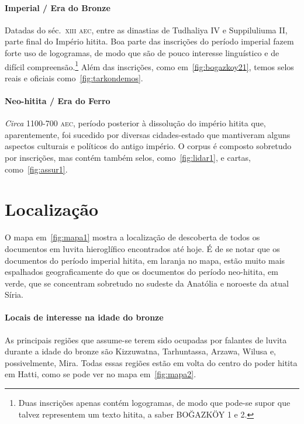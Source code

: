 \paragraph{Imperial \slash{} Era do Bronze} Datadas do séc.\ \textsc{xiii aec},
entre as dinastias de Tudhaliya IV e Suppiluliuma II, parte final do Império
hitita.
Boa parte das inscrições do período imperial fazem forte uso de logogramas,
de modo que são de pouco interesse linguístico e de difícil
compreensão.\footnote{Duas inscrições apenas contém logogramas, de modo que
	pode-se supor que talvez representem um texto hitita, a saber BOĞAZKÖY 1 e 2.}
Além das inscrições, como em~\autoref{fig:bogazkoy21},
temos selos reais e oficiais
como~\autoref{fig:tarkondemos}.


\paragraph{Neo-hitita \slash{} Era do Ferro} \emph{Circa} 1100-700 \textsc{aec},
período posterior à dissolução do império hitita que, aparentemente, foi
sucedido por diversas cidades-estado que mantiveram alguns aspectos
culturais e políticos do antigo império.
O corpus é composto sobretudo por inscrições, mas contém também selos,
como~\autoref{fig:lidar1}, e cartas, como~\autoref{fig:assur1}.



\section{Localização}

O mapa em~\autoref{fig:mapa1} mostra a localização de descoberta de todos os
documentos em luvita hieroglífico encontrados até hoje.
É de se notar que os documentos do período imperial hitita, em laranja no
mapa, estão muito mais espalhados geograficamente do que os documentos do
período neo-hitita, em verde, que se concentram sobretudo no sudeste da Anatólia
e noroeste da atual Síria.


\paragraph{Locais de interesse na idade do bronze}
As principais regiões que assume-se terem sido ocupadas por falantes de luvita
durante a idade do bronze são Kizzuwatna, Tarhuntassa, Arzawa, Wilusa e,
possivelmente, Mira.
Todas essas regiões estão em volta do centro do poder hitita em Hatti, como se
pode ver no mapa em~\autoref{fig:mapa2}.

